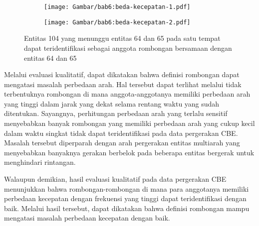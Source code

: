 \begin{figure}[h]
    \centering
    \captionsetup{width=.85\textwidth}
    \begin{subfigure}[h]{0.365\textwidth}
        \centering
        \texttt{[image: Gambar/bab6:beda-kecepatan-1.pdf]}
    \end{subfigure}
    \begin{subfigure}[h]{0.35\textwidth}
        \centering
        \texttt{[image: Gambar/bab6:beda-kecepatan-2.pdf]}
    \end{subfigure}
    \caption[Penyelesaian masalah beda kecepatan pada data CBE]{Entitas 104 yang menunggu entitas 64 dan 65 pada satu tempat dapat teridentifikasi sebagai anggota rombongan bersamaan dengan entitas 64 dan 65}
    \label{bab6:solusi-beda-kecepatan}
\end{figure}

Melalui evaluasi kualitatif, dapat dikatakan bahwa definisi rombongan dapat mengatasi masalah perbedaan arah. Hal tersebut dapat terlihat melalui tidak terbentuknya rombongan di mana anggota-anggotanya memiliki perbedaan arah yang tinggi dalam jarak yang dekat selama rentang waktu yang sudah ditentukan. Sayangnya, perhitungan perbedaan arah yang terlalu sensitif menyebabkan banyak rombongan yang memiliki perbedaan arah yang cukup kecil dalam waktu singkat tidak dapat teridentifikasi pada data pergerakan CBE. Masalah tersebut diperparah dengan arah pergerakan entitas multiarah yang menyebabkan banyaknya gerakan berbelok pada beberapa entitas bergerak untuk menghindari rintangan.

Walaupun demikian, hasil evaluasi kualitatif pada data pergerakan CBE menunjukkan bahwa rombongan-rombongan di mana para anggotanya memiliki perbedaan kecepatan dengan frekuensi yang tinggi dapat teridentifikasi dengan baik. Melalui hasil tersebut, dapat dikatakan bahwa definisi rombongan mampu mengatasi masalah perbedaan kecepatan dengan baik.